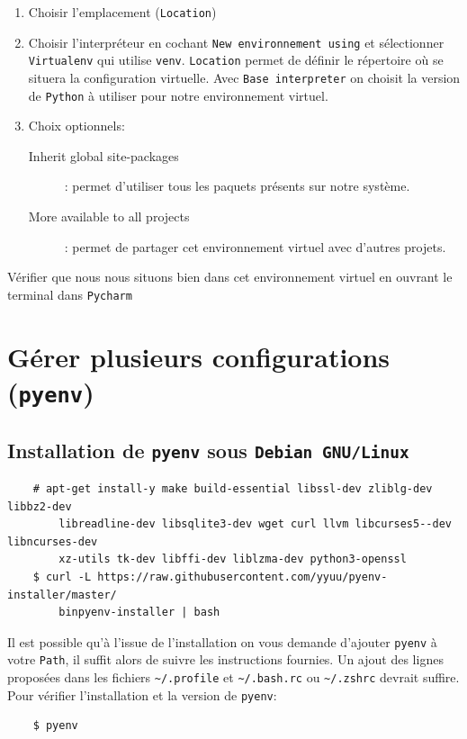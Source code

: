 \documentclass[a4paper,11pt]{book}
\begin{document}
\begin{enumerate}
	\item Choisir l'emplacement (\texttt{Location})
	\item Choisir l'interpréteur en cochant \texttt{New environnement using} et sélectionner \texttt{Virtualenv} qui utilise \texttt{venv}. \texttt{Location} permet de définir le répertoire où se situera la configuration virtuelle. Avec \texttt{Base interpreter} on choisit la version de \texttt{Python} à utiliser pour notre environnement virtuel.
	\item Choix optionnels:
	\begin{description}
		\item[Inherit global site-packages]: permet d'utiliser tous les paquets présents sur notre système.
		\item[More available to all projects]: permet de partager cet environnement virtuel avec d'autres projets.
	\end{description}
\end{enumerate}
\medskip

Vérifier que nous nous situons bien dans cet environnement virtuel en ouvrant le terminal dans \texttt{Pycharm}
\medskip

\section{Gérer plusieurs configurations (\texttt{pyenv})}
\subsection*{Installation de \texttt{pyenv} sous \texttt{Debian GNU/Linux}}
\begin{verbatim}
    # apt-get install-y make build-essential libssl-dev zliblg-dev libbz2-dev 
    	libreadline-dev libsqlite3-dev wget curl llvm libcurses5--dev libncurses-dev 
    	xz-utils tk-dev libffi-dev liblzma-dev python3-openssl
    $ curl -L https://raw.githubusercontent.com/yyuu/pyenv-installer/master/
    	binpyenv-installer | bash
\end{verbatim}
\medskip

Il est possible qu'à l'issue de l'installation on vous demande d'ajouter \texttt{pyenv} à votre \texttt{Path}, il suffit alors de suivre les instructions fournies. Un ajout des lignes proposées dans les fichiers \verb|~/.profile| et \verb|~/.bash.rc| ou \verb|~/.zshrc| devrait suffire. Pour vérifier l'installation et la version de \texttt{pyenv}:
\begin{verbatim}
    $ pyenv
\end{verbatim}
\medskip
\end{document}
